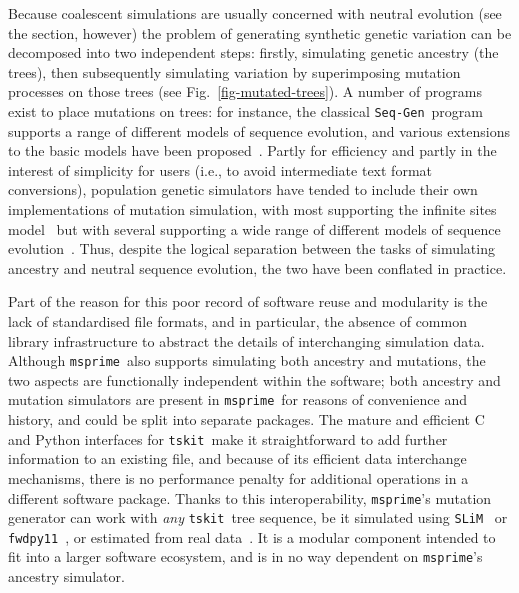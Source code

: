 \documentclass{article}
\newcommand{\msprime}[0]{\texttt{msprime}}
\newcommand{\tskit}[0]{\texttt{tskit}}
\newcommand{\SLiM}[0]{\texttt{SLiM}}
\newcommand{\fwdpy}[0]{\texttt{fwdpy11}}
\newcommand{\SeqGen}[0]{\texttt{Seq-Gen}}
\begin{document}
Because coalescent simulations are usually concerned with
neutral evolution (see the  section, however)
the problem of generating synthetic genetic variation can be decomposed into
two independent steps:
firstly, simulating genetic ancestry (the trees), then subsequently simulating
variation by superimposing mutation processes on those trees
(see Fig.~\ref{fig-mutated-trees}).
A number of programs exist to place mutations on trees: for instance,
the classical \SeqGen\ program~\citep{rambaut1997seq}
supports a range of different models of sequence evolution,
and various extensions to the basic
models have been proposed~\citep[e.g.][]{cartwright2005dna,fletcher2009indelible}.
Partly for efficiency and partly in the interest of
simplicity for users (i.e., to avoid intermediate text format conversions),
population genetic simulators have tended to
include their own implementations of mutation simulation, with
most supporting the infinite sites
model~\citep[e.g.][]{hudson2002generating}
but with several supporting a wide range of different models of sequence
evolution~\citep[e.g.][]{mailund2005coasim,excoffier2011fastsimcoal,
virgoulay2021gspace}. Thus, despite the logical separation between
the tasks of simulating ancestry and neutral sequence evolution,
the two have been conflated in practice.

Part of the reason for this poor record of software reuse and modularity is the
lack of standardised file formats, and in particular, the absence of common
library infrastructure to abstract the details of interchanging simulation
data. Although \msprime\ also supports simulating both ancestry and mutations,
the two aspects are functionally independent within the software; both ancestry and mutation simulators are present in \msprime\
for reasons of convenience and history,
and could be split into separate packages.
The mature and efficient C and Python interfaces for
\tskit\ make it straightforward to add further information to
an existing file, and because of its efficient data interchange mechanisms,
there is no performance penalty for additional operations
in a different software package.
Thanks to this interoperability, \msprime's
mutation generator can work with \emph{any} \tskit\ tree sequence,
be it simulated using \SLiM~\citep{haller2019slim} or
\fwdpy~\citep{thornton2014cpp}, or estimated from real
data~\citep{kelleher2019inferring,speidel2019method,wohns2021unified}.
It is a modular
component intended to fit into a larger software ecosystem, and
is in no way dependent on \msprime's ancestry simulator.
\end{document}
